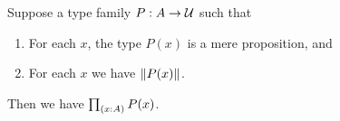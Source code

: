 \documentclass[hott-all.tex]{subfiles}
\begin{document}
\begin{cor}\label{cor:UC}
  Suppose a type family $P:A\to \mathcal{U}$ such that
  \begin{enumerate}
  \item For each $x$, the type $P(x)$ is a mere proposition, and
  \item For each $x$ we have $\mathopen{}\left\Vert P(x)\right\Vert_{}\mathclose{}$.
  \end{enumerate}
  Then we have $\prd{x:A} P(x)$.
\end{cor}
%
%
%
%
%
\end{document}
